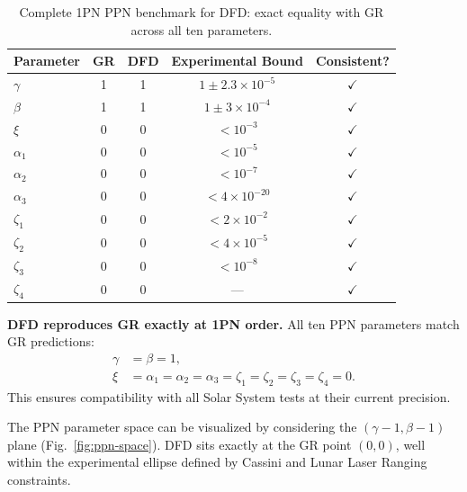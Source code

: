 \begin{table}[t]
\centering
\footnotesize
\caption{Complete 1PN PPN benchmark for DFD: exact equality with GR across all ten parameters.}\label{tab:ppn-dfd}
\renewcommand{\arraystretch}{1.2}
\begin{tabular}{lcccc}
\toprule
Parameter & GR & DFD & Experimental Bound & Consistent? \\
\midrule
$\gamma$ & 1 & 1 & $1 \pm 2.3 \times 10^{-5}$ & $\checkmark$ \\
$\beta$ & 1 & 1 & $1 \pm 3 \times 10^{-4}$ & $\checkmark$ \\
$\xi$ & 0 & 0 & $< 10^{-3}$ & $\checkmark$ \\
$\alpha_1$ & 0 & 0 & $< 10^{-5}$ & $\checkmark$ \\
$\alpha_2$ & 0 & 0 & $< 10^{-7}$ & $\checkmark$ \\
$\alpha_3$ & 0 & 0 & $< 4 \times 10^{-20}$ & $\checkmark$ \\
$\zeta_1$ & 0 & 0 & $< 2 \times 10^{-2}$ & $\checkmark$ \\
$\zeta_2$ & 0 & 0 & $< 4 \times 10^{-5}$ & $\checkmark$ \\
$\zeta_3$ & 0 & 0 & $< 10^{-8}$ & $\checkmark$ \\
$\zeta_4$ & 0 & 0 & --- & $\checkmark$ \\
\bottomrule
\end{tabular}
\end{table}

\begin{tcolorbox}[colback=green!5!white, colframe=green!50!black, title=Key Result: PPN Equivalence]
\textbf{DFD reproduces GR exactly at 1PN order.} All ten PPN parameters match GR predictions:
\begin{align}
\gamma &= \beta = 1, \nonumber\\
\xi &= \alpha_1 = \alpha_2 = \alpha_3 = \zeta_1 = \zeta_2 = \zeta_3 = \zeta_4 = 0.
\end{align}
This ensures compatibility with all Solar System tests at their current precision.
\end{tcolorbox}

The PPN parameter space can be visualized by considering the $(\gamma-1, \beta-1)$ plane (Fig.~\ref{fig:ppn-space}). DFD sits exactly at the GR point $(0, 0)$, well within the experimental ellipse defined by Cassini and Lunar Laser Ranging constraints.

